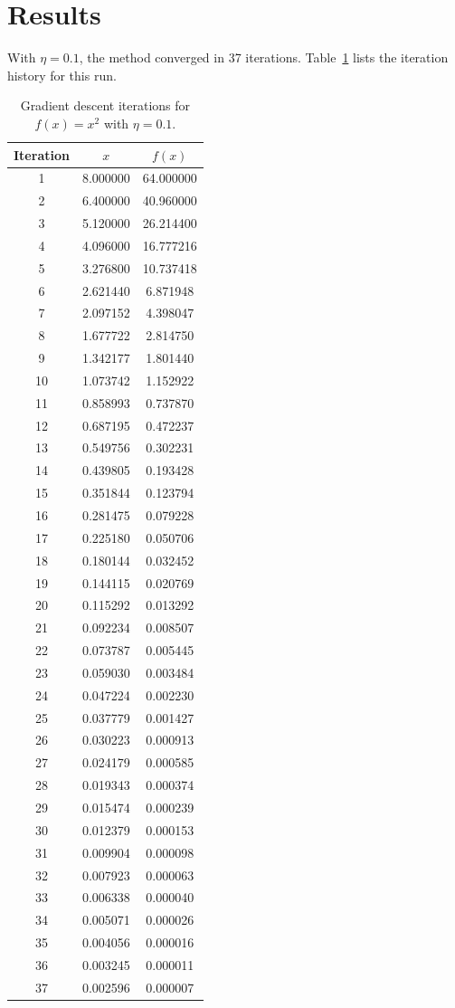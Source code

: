 \documentclass[conference]{IEEEtran}
\begin{document}
\section{Results}
With $\eta=0.1$, the method converged in 37 iterations. Table~\ref{tab:results} lists the iteration history for this run.

\begin{table}[h]
\caption{Gradient descent iterations for $f(x)=x^{2}$ with $\eta=0.1$.}
\label{tab:results}
\centering
\begin{tabular}{@{}ccc@{}}
\toprule
Iteration & $x$ & $f(x)$ \\
\midrule
1 & 8.000000 & 64.000000 \\
2 & 6.400000 & 40.960000 \\
3 & 5.120000 & 26.214400 \\
4 & 4.096000 & 16.777216 \\
5 & 3.276800 & 10.737418 \\
6 & 2.621440 & 6.871948 \\
7 & 2.097152 & 4.398047 \\
8 & 1.677722 & 2.814750 \\
9 & 1.342177 & 1.801440 \\
10 & 1.073742 & 1.152922 \\
11 & 0.858993 & 0.737870 \\
12 & 0.687195 & 0.472237 \\
13 & 0.549756 & 0.302231 \\
14 & 0.439805 & 0.193428 \\
15 & 0.351844 & 0.123794 \\
16 & 0.281475 & 0.079228 \\
17 & 0.225180 & 0.050706 \\
18 & 0.180144 & 0.032452 \\
19 & 0.144115 & 0.020769 \\
20 & 0.115292 & 0.013292 \\
21 & 0.092234 & 0.008507 \\
22 & 0.073787 & 0.005445 \\
23 & 0.059030 & 0.003484 \\
24 & 0.047224 & 0.002230 \\
25 & 0.037779 & 0.001427 \\
26 & 0.030223 & 0.000913 \\
27 & 0.024179 & 0.000585 \\
28 & 0.019343 & 0.000374 \\
29 & 0.015474 & 0.000239 \\
30 & 0.012379 & 0.000153 \\
31 & 0.009904 & 0.000098 \\
32 & 0.007923 & 0.000063 \\
33 & 0.006338 & 0.000040 \\
34 & 0.005071 & 0.000026 \\
35 & 0.004056 & 0.000016 \\
36 & 0.003245 & 0.000011 \\
37 & 0.002596 & 0.000007 \\
\bottomrule
\end{tabular}
\end{table}
\end{document}
